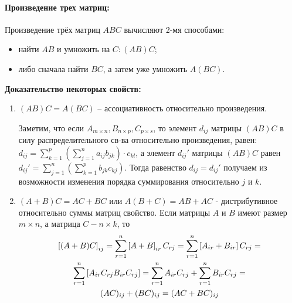\documentclass[a4paper,14pt]{article}
\begin{document}
\paragraph{Произведение трех матриц:}
\noindent Произведение трёх матриц $ABC$ вычисляют 2-мя способами:
\begin{itemize}
	\item найти $AB$ и умножить на $C: (AB)C$;
	\item либо сначала найти $BC$, а затем уже умножить $A(BC)$.	
\end{itemize}
\textbf{Доказательство некоторых свойств:}
\begin{enumerate}
	\item $(AB)C=A(BC)$ – ассоциативность относительно произведения.
	
	Заметим, что если $A_{m \times n}, B_{n \times p}, C_{p \times s}$, то элемент $d_{ij}$ матрицы $(AB)C$ в силу распределительного св-ва относительно произведения, равен: $d_{ij}=\sum\limits_{k=1}^p\left(\sum\limits_{j=1}^na_{ij}b_{jk}\right) \cdot c_{kl}$, а элемент $d_{ij}'$ матрицы $(AB)C$ равен $d_{ij}'=\sum\limits_{j=1}^n\left(\sum\limits_{k=1}^pb_{jk}c_{kj}\right)$. Тогда равенство $d_{ij}=d_{ij}'$ получаем из возможности изменения порядка суммирования относительно $j$ и $k$.
	\item $(A+B)C=AC+BC$ или $A(B+C)=AB+AC$ - дистрибутивное относительно суммы матриц свойство.
	Если матрицы $A$ и $B$ имеют размер $m \times n$, а матрица $C - n \times k$, то
	\begin{multline}
		\left[(A+B)C\right]_{ij}=\sum\limits_{r=1}^n\left[A+B\right]_{ir}C_{rj}=\sum\limits_{r=1}^n\left[A_{ir}+B_{ir}\right]C_{rj} \hm{=} \\ \sum\limits_{r=1}^n\left[A_{ir}C_{rj}B_{ir}C_{rj}\right] = \sum\limits_{r=1}^nA_{ir}C_{rj}+\sum\limits_{r=1}^nB_{ir}C_{rj}  \hm{=} \\ (AC)_{ij}+(BC)_{ij}=(AC+BC)_{ij}
	\end{multline}
	

\end{enumerate}
\end{document}

